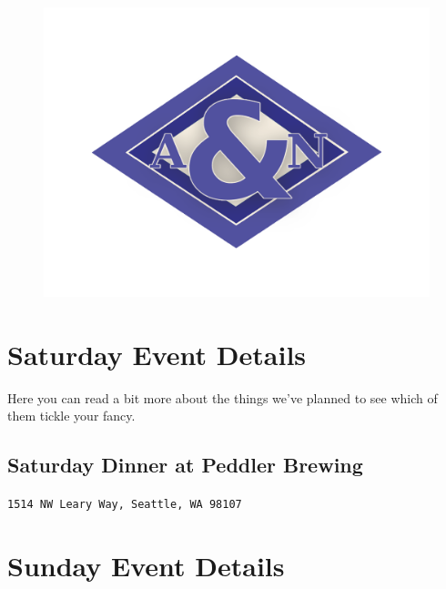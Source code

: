 \documentclass[10pt]{article}
\begin{document}
\vspace{0.5in}
\begin{figure}[h]
    \centering
    \includegraphics[width=\textwidth]{logo-navy-80}
\end{figure}

\newpage

\tableofcontents

\newpage

\section{Saturday Event Details}
Here you can read a bit more about the things we've planned to see which of them tickle your fancy.

\subsection{Saturday Dinner at Peddler Brewing}
\label{subsec-dinner-sat}
\begin{center}
    \texttt{1514 NW Leary Way, Seattle, WA 98107}
\end{center}

\newpage
\section{Sunday Event Details}
\end{document}
